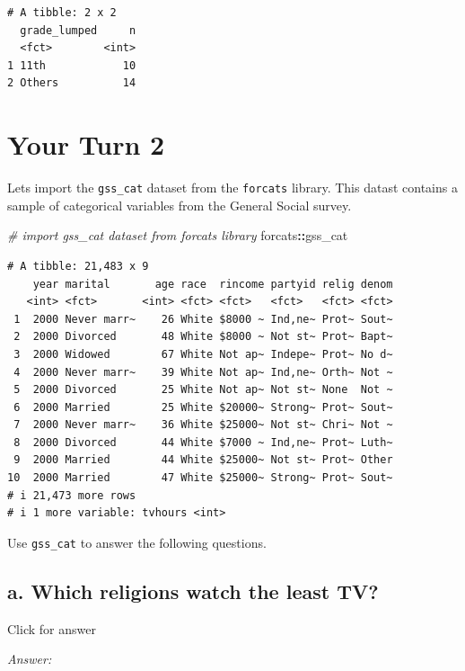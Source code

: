 \documentclass[
]{book}
\newenvironment{Shaded}{\begin{snugshade}}{\end{snugshade}}
\newcommand{\CommentTok}[1]{\textcolor[rgb]{0.56,0.35,0.01}{\textit{#1}}}
\newcommand{\NormalTok}[1]{#1}
\newcommand{\SpecialCharTok}[1]{\textcolor[rgb]{0.81,0.36,0.00}{\textbf{#1}}}
\begin{document}
\begin{verbatim}
# A tibble: 2 x 2
  grade_lumped     n
  <fct>        <int>
1 11th            10
2 Others          14
\end{verbatim}

\hypertarget{your-turn-2-2}{%
\section{Your Turn 2}\label{your-turn-2-2}}

Lets import the \texttt{gss\_cat} dataset from the \texttt{forcats} library. This datast contains a sample of categorical variables from the General Social survey.

\begin{Shaded}
\begin{Highlighting}[]
\CommentTok{\# import gss\_cat dataset from forcats library}
\NormalTok{forcats}\SpecialCharTok{::}\NormalTok{gss\_cat}
\end{Highlighting}
\end{Shaded}

\begin{verbatim}
# A tibble: 21,483 x 9
    year marital       age race  rincome partyid relig denom
   <int> <fct>       <int> <fct> <fct>   <fct>   <fct> <fct>
 1  2000 Never marr~    26 White $8000 ~ Ind,ne~ Prot~ Sout~
 2  2000 Divorced       48 White $8000 ~ Not st~ Prot~ Bapt~
 3  2000 Widowed        67 White Not ap~ Indepe~ Prot~ No d~
 4  2000 Never marr~    39 White Not ap~ Ind,ne~ Orth~ Not ~
 5  2000 Divorced       25 White Not ap~ Not st~ None  Not ~
 6  2000 Married        25 White $20000~ Strong~ Prot~ Sout~
 7  2000 Never marr~    36 White $25000~ Not st~ Chri~ Not ~
 8  2000 Divorced       44 White $7000 ~ Ind,ne~ Prot~ Luth~
 9  2000 Married        44 White $25000~ Not st~ Prot~ Other
10  2000 Married        47 White $25000~ Strong~ Prot~ Sout~
# i 21,473 more rows
# i 1 more variable: tvhours <int>
\end{verbatim}

Use \texttt{gss\_cat} to answer the following questions.

\hypertarget{a.-which-religions-watch-the-least-tv}{%
\subsection{a. Which religions watch the least TV?}\label{a.-which-religions-watch-the-least-tv}}

Click for answer

\emph{Answer:}
\end{document}
